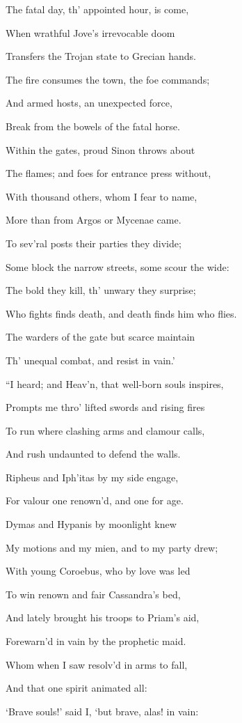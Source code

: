 The fatal day, th’ appointed hour, is come,

When wrathful Jove’s irrevocable doom

Transfers the Trojan state to Grecian hands.

The fire consumes the town, the foe commands;

And armed hosts, an unexpected force,

Break from the bowels of the fatal horse.

Within the gates, proud Sinon throws about

The flames; and foes for entrance press without,

With thousand others, whom I fear to name,

More than from Argos or Mycenae came.

To sev’ral posts their parties they divide;

Some block the narrow streets, some scour the wide:

The bold they kill, th’ unwary they surprise;

Who fights finds death, and death finds him who flies.

The warders of the gate but scarce maintain

Th’ unequal combat, and resist in vain.’

“I heard; and Heav’n, that well-born souls inspires,

Prompts me thro’ lifted swords and rising fires

To run where clashing arms and clamour calls,

And rush undaunted to defend the walls.

Ripheus and Iph’itas by my side engage,

For valour one renown’d, and one for age.

Dymas and Hypanis by moonlight knew

My motions and my mien, and to my party drew;

With young Coroebus, who by love was led

To win renown and fair Cassandra’s bed,

And lately brought his troops to Priam’s aid,

Forewarn’d in vain by the prophetic maid.

Whom when I saw resolv’d in arms to fall,

And that one spirit animated all:

‘Brave souls!’ said I, ‘but brave, alas! in vain:

